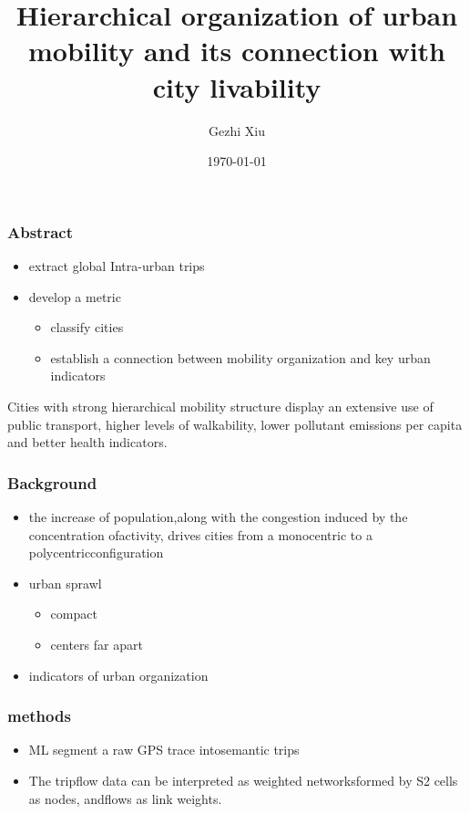 \documentclass{beamer}
\title[Hierarchical Mobility]{Hierarchical organization of urban mobility and its connection with city livability}
\author[G. Xiu]{Gezhi Xiu} %
\institute[IRSGIS PKU]{Complexity Research Group,\\Peking University}
\date[\today]{\today}
\begin{document}
\maketitle
\begin{frame} \frametitle{Abstract}

\begin{itemize}
\item extract global Intra-urban trips
\item develop a metric
  \begin{itemize}
    \item classify cities
    \item establish a connection between mobility organization and key urban indicators
  \end{itemize}
\end{itemize}
Cities with strong hierarchical mobility structure display an extensive use of public transport, higher levels of walkability, lower pollutant emissions per capita and better health indicators.
\end{frame}

\begin{frame}[fragile] \frametitle{Background}
\begin{itemize}
  \item the increase of population,along with the congestion induced by the concentration ofactivity, drives cities from a monocentric to a polycentricconfiguration
  \item urban sprawl
  \begin{itemize}
    \item compact
    \item centers far apart
  \end{itemize}
  \item indicators of urban organization
\end{itemize}
\end{frame}

\begin{frame}[fragile] \frametitle{methods}
\begin{itemize}
\item ML segment a raw GPS trace intosemantic trips
\item The tripflow data can be interpreted as weighted networksformed by S2 cells as nodes, andflows as link weights.
\end{itemize}

\end{frame}

\begin{frame}[fragile] \frametitle{\textbackslash utbeamerset}}
\\utbeamerset\{optiona=valuea, optionb=valueb, optionc=valuec\}
\end{semiverbatim}
}
\end{frame}
\end{document}
